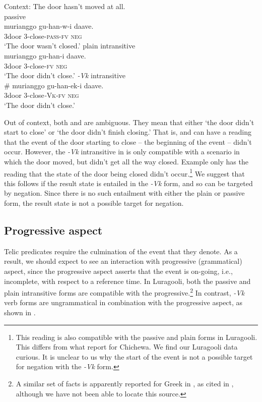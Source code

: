 \documentclass[output=paper]{langsci/lanmgscibook}
\begin{document}
\ea\label{ex:gluckman:13} 
{Context: The door hasn’t moved at all.}\\
  \ea\label{ex:gluckman:13a}
  {{passive}}\\
  \gll   murianggo gu-han-w-i           daave.\\
	3door        3-close-\textsc{pass}-\textsc{fv}    \textsc{neg}\\
  \glt ‘The door wasn’t closed.’
  \ex\label{ex:gluckman:13b}
  {{plain intransitive}}\\
  \gll   murianggo gu-han-i     daave.\\
	3door         3-close-\textsc{fv}  \textsc{neg}\\
  \glt ‘The door didn’t close.’
  \ex\label{ex:gluckman:13c}
  { {\textit{-Vk}}{ intransitive}}\\
  \gll   \# murianggo gu-han-ek-i      daave.\\
	  {}  3door         3-close\textit{-}\textsc{Vk}-\textsc{fv}   \textsc{neg}\\
  \glt ‘The door didn’t close.’
  \z
\z

Out of context, both  and  are ambiguous. They mean that either ‘the door didn’t start to close’ or ‘the door didn’t finish closing.’ That is,  and  can have a reading that the event of the door starting to close – the beginning of the event – didn’t occur. However, the \textit{-Vk} intransitive in  is only compatible with a scenario in which the door moved, but didn’t get all the way closed. Example  only has the reading that the state of the door being closed didn’t occur.\footnote{This reading is also compatible with the passive and plain forms in Luragooli. This differs from what \citet{Dubinsky1996} report for Chichewa. We find our Luragooli data curious. It is unclear to us why the start of the event is not a possible target for negation with the \textit{-Vk} form.}  We suggest that this follows if the result state is entailed in the \textit{-Vk} form, and so can be targeted by negation. Since there is no such entailment with either the plain or passive form, the result state is not a possible target for negation.

\subsection{Progressive aspect}

Telic predicates require the culmination of the event that they denote. As a result, we should expect to see an interaction with progressive (grammatical) aspect, since the progressive aspect asserts that the event is on-going, i.e., incomplete, with respect to a reference time. In Luragooli, both the passive  and plain intransitive  forms are compatible with the progressive.\footnote{A similar set of facts is apparently reported for Greek in \citet{Mavromanolaki2002}, as cited in \citet{AlexiadouEtAl2015}, although we have not been able to locate this source.} In contrast, \textit{-Vk} verb forms are ungrammatical in combination with the progressive aspect, as shown in .
\end{document}
